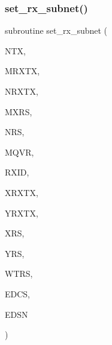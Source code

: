 \mbox{\label{Leroi__c_8f90_a9100f1607055290b050e961c8027016a}} 
\subsubsection{\texorpdfstring{set\+\_\+rx\+\_\+subnet()}{set\_rx\_subnet()}}
{\footnotesize\ttfamily subroutine set\+\_\+rx\+\_\+subnet (\begin{DoxyParamCaption}\item[{integer}]{N\+TX,  }\item[{integer}]{M\+R\+X\+TX,  }\item[{integer, dimension(ntx)}]{N\+R\+X\+TX,  }\item[{integer}]{M\+X\+RS,  }\item[{integer, dimension(mrxtx,ntx)}]{N\+RS,  }\item[{integer}]{M\+Q\+VR,  }\item[{integer, dimension(mrxtx,ntx)}]{R\+X\+ID,  }\item[{real, dimension (mrxtx,ntx,mqvr)}]{X\+R\+X\+TX,  }\item[{real, dimension (mrxtx,ntx,mqvr)}]{Y\+R\+X\+TX,  }\item[{real, dimension (mxrs,mrxtx,ntx)}]{X\+RS,  }\item[{real, dimension (mxrs,mrxtx,ntx)}]{Y\+RS,  }\item[{real, dimension (mxrs,mrxtx,ntx)}]{W\+T\+RS,  }\item[{real, dimension (mrxtx,ntx)}]{E\+D\+CS,  }\item[{real, dimension (mrxtx,ntx)}]{E\+D\+SN }\end{DoxyParamCaption})}

\mbox{\label{Leroi__c_8f90_a805e33739aa8ba4bfe42148473309ce0}} 
